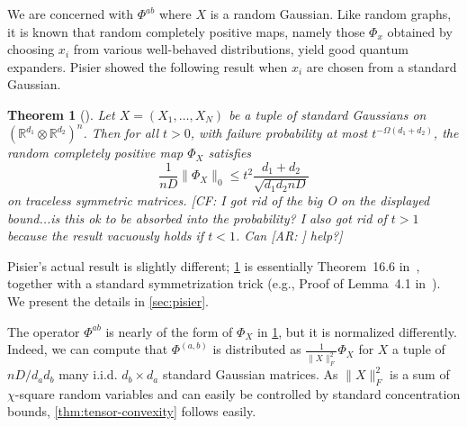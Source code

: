 \documentclass[aos]{imsart}
\newtheorem{theorem}{Theorem}[section]
\theoremstyle{definition}
\numberwithin{equation}{section}
\DeclareMathOperator{\tr}{Tr}
\newcommand{\R}{{\mathbb{R}}}
\newcommand{\ot}{\otimes}
\newcommand{\eps}{\varepsilon}
\newcommand{\samp}{x}
\newcommand{\rv}{X}
\newcommand{\CF}[1]{{\color{purple}[CF: #1]}}
\newcommand{\AR}[1]{{\color{orange}[AR: #1]}}
\begin{document}
We are concerned with $\Phi^{ab}$ where $\rv$ is a random Gaussian.  Like random graphs, it is known that random completely positive maps, namely those $\Phi_\samp$ obtained by choosing $x_i$ from various well-behaved distributions, yield good quantum expanders. Pisier showed the following result when $x_i$ are chosen from a standard Gaussian. 


\begin{theorem}[\cite{pisier2012grothendieck, P14}]\label{thm:hess-pisier} Let $X = (X_1, \dots, X_N)$ be a tuple of standard Gaussians on $(\R^{d_1}\ot \R^{d_2})^n$. Then for all $t >0$, with failure probability at most $t^{-\Omega(d_{1} + d_{2})}$, the random completely positive map $\Phi_X$ satisfies 
$$\frac{1}{nD}\|\Phi_{X}\|_0 \leq t^{2} \frac{d_{1}+d_{2}}{\sqrt{d_{1} d_{2} nD}}$$ on traceless symmetric matrices. \CF{I got rid of the big O on the displayed bound...is this ok to be absorbed into the probability? I also got rid of $t > 1$ because the result vacuously holds if $t < 1$. Can \AR{} help?}\end{theorem} 


Pisier's actual result is slightly different; \cref{thm:hess-pisier} is essentially Theorem~16.6 in~\cite{pisier2012grothendieck}, together with a standard symmetrization trick (e.g., Proof of Lemma~4.1 in~\cite{P14}). We present the details in \cref{sec:pisier}. 

The operator $\Phi^{ab}$ is nearly of the form of $\Phi_{\rv}$ in \cref{thm:hess-pisier}, but it is normalized differently. Indeed, we can compute that $\Phi^{(a,b)}$ is distributed as $\frac{1}{\|X\|_F^2}\Phi_{X}$ for $X$ a tuple of $n D/d_a d_b$ many i.i.d. $d_b \times d_a $ standard Gaussian matrices. As $\|X\|_F^2$ is a sum of $\chi$-square random variables and can easily be controlled by standard concentration bounds, \cref{thm:tensor-convexity} follows easily.
\end{document}
